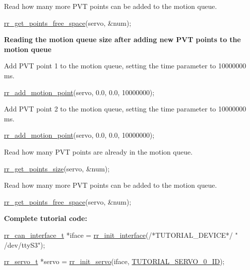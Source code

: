 \begin{DoxyEnumerate}
\item Read how many more P\+VT points can be added to the motion queue. 
\begin{DoxyCodeInclude}
    \hyperlink{group___trajectory_gaafd0d575c047ed269664fbc760a640c1}{rr\_get\_points\_free\_space}(servo, &num);
\end{DoxyCodeInclude}
 {\bfseries  Reading the motion queue size after adding new P\+VT points to the motion queue}
\item Add P\+VT point 1 to the motion queue, setting the time parameter to 10000000 ms. 
\begin{DoxyCodeInclude}
    \hyperlink{group___trajectory_gaba5ac04eeadd4a8d888b409f34837ece}{rr\_add\_motion\_point}(servo, 0.0, 0.0, 10000000);
\end{DoxyCodeInclude}

\item Add P\+VT point 2 to the motion queue, setting the time parameter to 10000000 ms. 
\begin{DoxyCodeInclude}
    \hyperlink{group___trajectory_gaba5ac04eeadd4a8d888b409f34837ece}{rr\_add\_motion\_point}(servo, 0.0, 0.0, 10000000);
\end{DoxyCodeInclude}

\item Read how many P\+VT points are already in the motion queue. 
\begin{DoxyCodeInclude}
    \hyperlink{group___trajectory_gae6ed290842e08d349dd86bb1264e6a17}{rr\_get\_points\_size}(servo, &num);
\end{DoxyCodeInclude}

\item Read how many more P\+VT points can be added to the motion queue. 
\begin{DoxyCodeInclude}
    \hyperlink{group___trajectory_gaafd0d575c047ed269664fbc760a640c1}{rr\_get\_points\_free\_space}(servo, &num);
\end{DoxyCodeInclude}
 {\bfseries  Complete tutorial code\+: } 
\begin{DoxyCodeInclude}
    \hyperlink{structrr__can__interface__t}{rr\_can\_interface\_t} *iface = \hyperlink{group___init_ga472a4890dcc7d7a13123c56a06946d91}{rr\_init\_interface}(\textcolor{comment}{/*TUTORIAL\_DEVICE*/} \textcolor{stringliteral}{"
      /dev/ttyS3"});

    \hyperlink{structrr__servo__t}{rr\_servo\_t} *servo = \hyperlink{group___init_ga0adb313a3eeb8a4399431e940a1f3e9e}{rr\_init\_servo}(iface, 
      \hyperlink{tutorial_8h_a9a3d33f25d3a72a8e30c885d238b3b65}{TUTORIAL\_SERVO\_0\_ID});


\end{DoxyCodeInclude}
\end{DoxyEnumerate}
